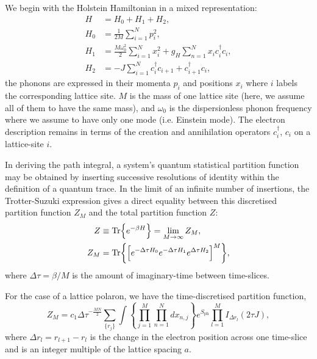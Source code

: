 We begin with the Holstein Hamiltonian in a mixed representation:
\begin{equation}
    \begin{aligned}
        H &= H_{0} + H_{1} + H_{2} , \\
        H_{0} &= \frac{1}{2M} \sum_{i=1}^N p_i^2 , \\
        H_{1} &= \frac{M \omega_0^2}{2} \sum_{i=1}^N x_i^2 + g_H \sum_{n=1}^N x_i c^\dagger_i c_i , \\
        H_{2} &= -J \sum_{i=1}^N c^\dagger_i c_{i+1} + c_{i+1}^\dagger c_i ,
    \end{aligned}
\end{equation}
the phonons are expressed in their momenta $p_i$ and positions $x_i$ where $i$ labels the corresponding lattice site. $M$ is the mass of one lattice site (here, we assume all of them to have the same mass), and $\omega_0$ is the dispersionless phonon frequency where we assume to have only one mode (i.e. Einstein mode). The electron description remains in terms of the creation and annihilation operators $c^\dagger_i$, $c_i$ on a lattice-site $i$.

In deriving the path integral, a system's quantum statistical partition function may be obtained by inserting successive resolutions of identity within the definition of a quantum trace. In the limit of an infinite number of insertions, the Trotter-Suzuki expression \cite{trotter_product_1959, hatano_finding_2005} gives a direct equality between this discretised partition function $Z_M$ and the total partition function $Z$:
\begin{equation}
    \begin{aligned}
        Z &\equiv \Tr{e^{-\beta H}} = \lim_{M\to\infty} Z_M , \\
        Z_M &= \Tr{\left[ e^{-\Delta\tau H_0} e^{-\Delta\tau H_1} e^{\Delta\tau H_2} \right]^M} ,
    \end{aligned}
\end{equation}
where $\Delta\tau = \beta / M$ is the amount of imaginary-time between time-slices.

For the case of a lattice polaron, we have the time-discretised partition function,
\begin{equation}
    Z_M = c_1 {\Delta\tau}^{-\frac{MN}{2}} \sum_{\{r_j\}} \int \left\{ \prod_{j=1}^M \prod_{n=1}^N dx_{n,j} \right\} e^{S_{\text{ph}}} \prod_{l=1}^M I_{\Delta r_l}(2 \tau J) ,
\end{equation}
where $\Delta r_l = r_{l+1} - r_l$ is the change in the electron position across one time-slice and is an integer multiple of the lattice spacing $a$.

